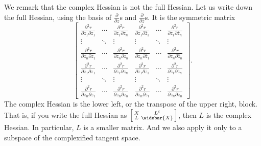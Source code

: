 \documentclass[12pt,openany]{book}
\theoremstyle{plain}
\theoremstyle{remark}
\theoremstyle{definition}
\theoremstyle{exercise}
\theoremstyle{example}
\begin{document}
We remark that the complex Hessian is not the full Hessian.
Let us write down the full Hessian, using the
basis of $\frac{\partial}{\partial z}$s and
$\frac{\partial}{\partial \bar{z}}$s.  It is
the symmetric matrix
\begin{equation*}
\begin{bmatrix}
\frac{\partial^2 r}{\partial z_1 \partial z_1}
& \cdots &
\frac{\partial^2 r}{\partial z_1 \partial z_n}
&
\frac{\partial^2 r}{\partial z_1 \partial \bar{z}_1} 
& \cdots &
\frac{\partial^2 r}{\partial z_1 \partial \bar{z}_n} 
\\
\vdots & \ddots & \vdots & \vdots & \ddots & \vdots
\\
\frac{\partial^2 r}{\partial z_n \partial z_1}
& \cdots &
\frac{\partial^2 r}{\partial z_n \partial z_n}
&
\frac{\partial^2 r}{\partial z_n \partial \bar{z}_1} 
& \cdots &
\frac{\partial^2 r}{\partial z_n \partial \bar{z}_n} 
\\
\frac{\partial^2 r}{\partial \bar{z}_1 \partial z_1}
& \cdots &
\frac{\partial^2 r}{\partial \bar{z}_1 \partial z_n}
&
\frac{\partial^2 r}{\partial \bar{z}_1 \partial \bar{z}_1} 
& \cdots &
\frac{\partial^2 r}{\partial \bar{z}_1 \partial \bar{z}_n} 
\\
\vdots & \ddots & \vdots & \vdots & \ddots & \vdots
\\
\frac{\partial^2 r}{\partial \bar{z}_n \partial z_1}
& \cdots &
\frac{\partial^2 r}{\partial \bar{z}_n \partial z_n}
&
\frac{\partial^2 r}{\partial \bar{z}_n \partial \bar{z}_1} 
& \cdots &
\frac{\partial^2 r}{\partial \bar{z}_n \partial \bar{z}_n} 
\end{bmatrix}
.
\end{equation*}
The complex Hessian is the lower left,
or the transpose of the upper right, block.  That is,
if you write the full Hessian as
$\left[ \begin{smallmatrix} X & L^t \\ L & \widebar{X} \end{smallmatrix}
\right]$, then $L$ is the complex Hessian.
In particular, $L$ is a smaller matrix. And we also apply it only to a subspace 
of the complexified tangent space.
\end{document}
